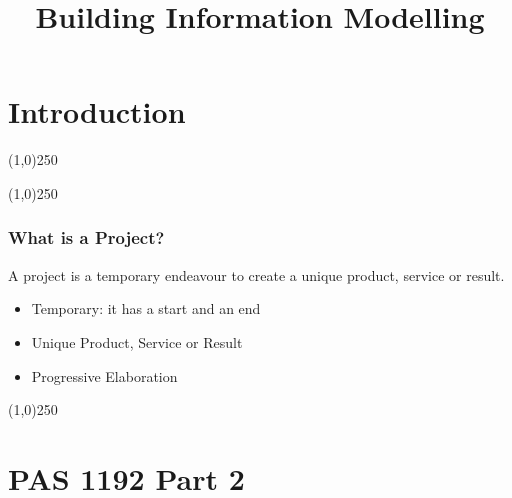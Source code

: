 



%
\title[Building Information Modelling]{Building Information Modelling}



%
\usetikzlibrary{arrows}



\newpage




\thispagestyle{empty}
\tableofcontents
\newpage
\section{Introduction}


\begin{frame}
\titlepage
\end{frame}\begin{center}\line(1,0){250}\end{center}
%
%
\begin{center}\line(1,0){250}\end{center}



\begin{frame}
\frametitle{What is a Project?}
A project is a temporary endeavour to create a unique product, service or result.\\
\begin{itemize}
\item Temporary: it has a start and an end
\item Unique Product, Service or Result
\item Progressive Elaboration
\end{itemize}
\end{frame}
\begin{center}\line(1,0){250}\end{center}











\section{PAS 1192 Part 2}






